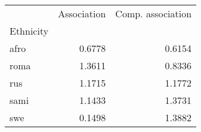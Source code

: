 \begin{tabular}{lrr}
\toprule
{} &  Association &  Comp. association \\
Ethnicity &              &                    \\
\midrule
afro      &       0.6778 &             0.6154 \\
roma      &       1.3611 &             0.8336 \\
rus       &       1.1715 &             1.1772 \\
sami      &       1.1433 &             1.3731 \\
swe       &       0.1498 &             1.3882 \\
\bottomrule
\end{tabular}
